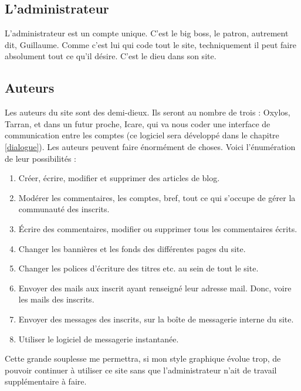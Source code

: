\documentclass[french]{report}
\theoremstyle{plain}
\begin{document}
		\subsection{L'administrateur}
			L'administrateur est un compte unique. C'est le big boss, le patron, autrement dit, Guillaume. Comme c'est lui qui code tout le site, techniquement il peut faire absolument tout ce qu'il désire. C'est le dieu dans son site.

		\subsection{Auteurs}
			Les auteurs du site sont des demi-dieux. Ils seront au nombre de trois : Oxylos, Tarran, et dans un futur proche, Icare, qui va nous coder une interface de communication entre les comptes (ce logiciel sera développé dans le chapitre \ref{dialogue}). Les auteurs peuvent faire énormément de choses. Voici l'énumération de leur possibilités :
			\begin{enumerate}
				\item Créer, écrire, modifier et supprimer des articles de blog.
				\item Modérer les commentaires, les comptes, bref, tout ce qui s'occupe de gérer la communauté des inscrits.
				\item Écrire des commentaires, modifier ou supprimer tous les commentaires écrits.
				\item Changer les bannières et les fonds des différentes pages du site.
				\item Changer les polices d'écriture des titres etc. au sein de tout le site. 
				\item Envoyer des mails aux inscrit ayant renseigné leur adresse mail. Donc, voire les mails des inscrits.
				\item Envoyer des messages des inscrits, sur la boîte de messagerie interne du site.
				\item Utiliser le logiciel de messagerie instantanée.
			\end{enumerate}
			Cette grande souplesse me permettra, si mon style graphique évolue trop, de pouvoir continuer à utiliser ce site sans que l'administrateur n'ait de travail supplémentaire à faire.
\end{document}
